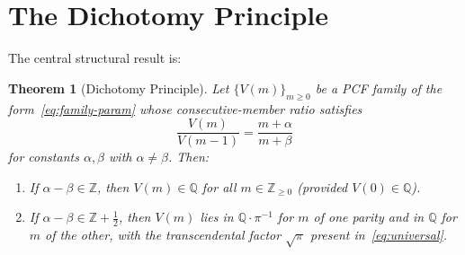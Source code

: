 \documentclass[11pt,a4paper]{article}
\newtheorem{theorem}{Theorem}
\theoremstyle{definition}
\theoremstyle{remark}
\begin{document}
\section{The Dichotomy Principle}\label{sec:dichotomy}

The central structural result is:

\begin{theorem}[Dichotomy Principle]\label{thm:dichotomy}
Let $\{V(m)\}_{m \geq 0}$ be a PCF family of the
form~\eqref{eq:family-param} whose consecutive-member ratio satisfies
\[
  \frac{V(m)}{V(m-1)} = \frac{m+\alpha}{m+\beta}
\]
for constants $\alpha, \beta$ with $\alpha \neq \beta$.  Then:
\begin{enumerate}
\item[\textup{(T)}]
  If\/ $\alpha - \beta \in \mathbb{Z}$, then $V(m) \in \mathbb{Q}$
  for all $m \in \mathbb{Z}_{\geq 0}$
  \textup{(}provided $V(0) \in \mathbb{Q}$\textup{)}.
\item[\textup{(S)}]
  If\/ $\alpha - \beta \in \mathbb{Z} + \tfrac{1}{2}$,
  then $V(m)$ lies in $\mathbb{Q} \cdot \pi^{-1}$ for $m$ of one parity
  and in $\mathbb{Q}$ for $m$ of the other, with the
  transcendental factor $\sqrt\pi$ present in~\eqref{eq:universal}.
\end{enumerate}
\end{theorem}
\end{document}
